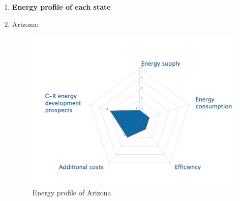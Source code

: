 \documentclass{mcmthesis}
\begin{document}
\begin{enumerate}
        \begin{enumerate}
          \item \textbf{Energy profile of each state}

          \item Arizona:
        \begin{figure}
            \centering
            \includegraphics[scale=0.6]{AZ.png}
            \caption{Energy profile of Arizona}
        \end{figure}


\end{enumerate}
\end{enumerate}
\end{document}
